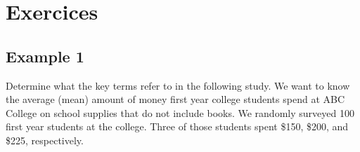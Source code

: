 \documentclass[
  letterpaper,
  DIV=11,
  numbers=noendperiod]{scrreprt}
\begin{document}
\section{Exercices}\label{exercices}

\subsection{Example 1}\label{example-1}

\begin{tcolorbox}[enhanced jigsaw, colframe=quarto-callout-note-color-frame, bottomtitle=1mm, colbacktitle=quarto-callout-note-color!10!white, bottomrule=.15mm, toprule=.15mm, breakable, leftrule=.75mm, left=2mm, rightrule=.15mm, colback=white, opacityback=0, opacitybacktitle=0.6, toptitle=1mm, titlerule=0mm, title=\textcolor{quarto-callout-note-color}{\faInfo}\hspace{0.5em}{Problem}, arc=.35mm, coltitle=black]

Determine what the key terms refer to in the following study. We want to
know the average (mean) amount of money first year college students
spend at ABC College on school supplies that do not include books. We
randomly surveyed 100 first year students at the college. Three of those
students spent \$150, \$200, and \$225, respectively.

\end{tcolorbox}
\end{document}
